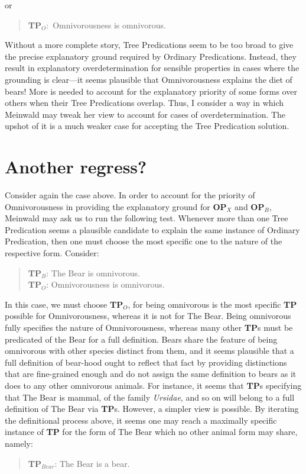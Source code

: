  \noindent or 
\begin{quote}\textbf{TP$_O:$} Omnivorousness is omnivorous. 
\end{quote}

\noindent Without a more complete story, Tree Predications seem to be too broad to give the precise explanatory ground required by Ordinary Predications. Instead, they result in explanatory overdetermination for sensible properties in cases where the grounding is clear---it seems plausible that Omnivorousness explains the diet of bears! More is needed to account for the explanatory priority of some forms over others when their Tree Predications overlap. Thus, I consider a way in which Meinwald may tweak her view to account for cases of overdetermination. The upshot of it is a much weaker case for accepting the Tree Predication solution.

\section{Another regress?}

Consider again the case above. In order to account for the priority of Omnivorousness in providing the explanatory ground for \textbf{OP$_X$} and \textbf{OP$_B$}, Meinwald may ask us to run the following test. Whenever more than one Tree Predication seems a plausible candidate to explain the same instance of Ordinary Predication, then one must choose the most specific one to the nature of the respective form. Consider: 
\begin{quote}
\textbf{TP$_B$}: The Bear is omnivorous.\\
\textbf{TP$_O$}: Omnivorousness is omnivorous.
\end{quote}

\noindent In this case, we must choose \textbf{TP$_O$}, for being omnivorous is the most specific \textbf{TP} possible for Omnivorousness, whereas it is not for The Bear. Being omnivorous fully specifies the nature of Omnivorousness, whereas many other \textbf{TP}s must be predicated of the Bear for a full definition. Bears share the feature of being omnivorous with other species distinct from them, and it seems plausible that a full definition of bear-hood ought to reflect that fact by providing distinctions that are fine-grained enough and do not assign the same definition to bears as it does to any other omnivorous animals. For instance, it seems that \textbf{TP}s specifying that The Bear is mammal, of the family \textit{Ursidae}, and so on will belong to a full definition of The Bear via \textbf{TP}s. However, a simpler view is possible. By iterating the definitional process above, it seems one may reach a maximally specific instance of \textbf{TP} for the form of The Bear which no other animal form may share, namely:
\begin{quote}
\textbf{TP$_{Bear}$}: The Bear is a bear.
\end{quote} 

